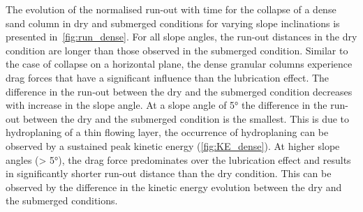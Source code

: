 The evolution of the normalised run-out with time for the collapse of a dense 
sand column in dry and submerged conditions for varying slope inclinations is 
presented in~\cref{fig:run_dense}. For all slope angles, the run-out distances 
in the dry condition are longer than those observed in the submerged condition. 
Similar to the case of collapse on a horizontal plane, the dense granular 
columns experience drag forces that have a significant influence than the 
lubrication effect. The difference in the run-out between the dry and the 
submerged condition decreases with increase in the slope angle. At a slope 
angle of 5\si{\degree} the difference in the run-out between 
the dry and the submerged condition is the smallest. This is due to 
hydroplaning of a thin flowing layer, the occurrence of hydroplaning can be 
observed by a sustained peak kinetic energy (\cref{fig:KE_dense}). At 
higher slope angles (> 5\si{\degree}), the drag force predominates over the 
lubrication effect and results in significantly shorter run-out distance than 
the dry condition. This can be observed by the difference in the kinetic energy 
evolution between the dry and the submerged conditions.

